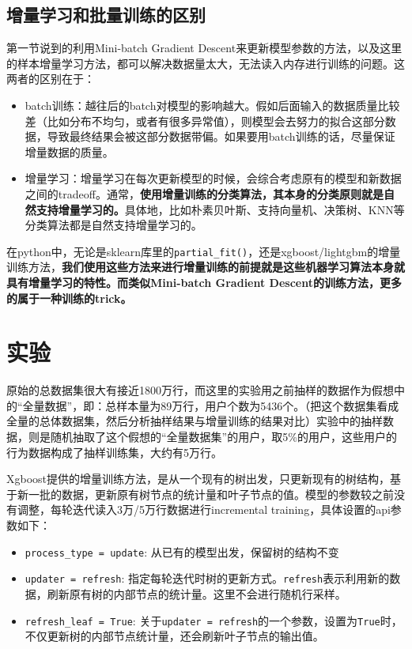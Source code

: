 \documentclass{article}
\begin{document}
	\subsection{增量学习和批量训练的区别}
	第一节说到的利用Mini-batch Gradient Descent来更新模型参数的方法，以及这里的样本增量学习方法，都可以解决数据量太大，无法读入内存进行训练的问题。这两者的区别在于：
	\begin{itemize}
		\item batch训练：越往后的batch对模型的影响越大。假如后面输入的数据质量比较差（比如分布不均匀，或者有很多异常值），则模型会去努力的拟合这部分数据，导致最终结果会被这部分数据带偏。如果要用batch训练的话，尽量保证增量数据的质量。
		\item 增量学习：增量学习在每次更新模型的时候，会综合考虑原有的模型和新数据之间的tradeoff。通常，\textbf{使用增量训练的分类算法，其本身的分类原则就是自然支持增量学习的。}具体地，比如朴素贝叶斯、支持向量机、决策树、KNN等分类算法都是自然支持增量学习的。
	\end{itemize}

	在python中，无论是sklearn库里的\texttt{partial_fit()}，还是xgboost/lightgbm的增量训练方法，\textbf{我们使用这些方法来进行增量训练的前提就是这些机器学习算法本身就具有增量学习的特性。而类似Mini-batch Gradient Descent的训练方法，更多的属于一种训练的trick。}

\section{实验}
原始的总数据集很大有接近1800万行，而这里的实验用之前抽样的数据作为假想中的“全量数据”，即：总样本量为89万行，用户个数为5436个。（把这个数据集看成全量的总体数据集，然后分析抽样结果与增量训练的结果对比）实验中的抽样数据，则是随机抽取了这个假想的“全量数据集”的用户，取5\%的用户，这些用户的行为数据构成了抽样训练集，大约有5万行。

Xgboost提供的增量训练方法，是从一个现有的树出发，只更新现有的树结构，基于新一批的数据，更新原有树节点的统计量和叶子节点的值。模型的参数较之前没有调整，每轮迭代读入3万/5万行数据进行incremental training，具体设置的api参数如下：

\begin{itemize}
	\item \texttt{process_type = update}: 从已有的模型出发，保留树的结构不变
	\item \texttt{updater = refresh}: 指定每轮迭代时树的更新方式。\texttt{refresh}表示利用新的数据，刷新原有树的内部节点的统计量。这里不会进行随机行采样。
	\item \texttt{refresh_leaf = True}: 关于\texttt{updater = refresh}的一个参数，设置为\texttt{True}时，不仅更新树的内部节点统计量，还会刷新叶子节点的输出值。
\end{itemize}
\end{document}

